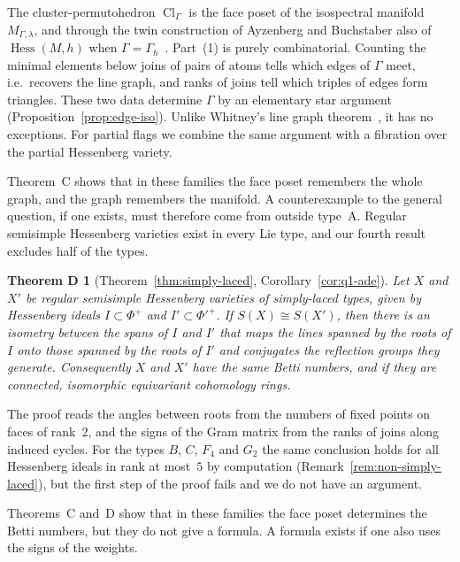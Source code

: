 \documentclass[11pt,a4paper]{article}
\numberwithin{equation}{section}
\theoremstyle{plain}
\newtheorem*{theoremD}{Theorem D}
\theoremstyle{definition}
\theoremstyle{remark}
\DeclareMathOperator{\Hess}{Hess}
\DeclareMathOperator{\Cl}{Cl}
\begin{document}
The cluster-permutohedron $\Cl_\Gamma$ is the face poset of the isospectral manifold $M_{\Gamma,\lambda}$, and through the twin construction of Ayzenberg and Buchstaber also of $\Hess(M,h)$ when $\Gamma=\Gamma_h$~\cite{AB21,AB24}. Part~(1) is purely combinatorial. Counting the minimal elements below joins of pairs of atoms tells which edges of $\Gamma$ meet, i.e.\ recovers the line graph, and ranks of joins tell which triples of edges form triangles. These two data determine $\Gamma$ by an elementary star argument (Proposition~\ref{prop:edge-iso}). Unlike Whitney's line graph theorem~\cite{Whi32,Jun66}, it has no exceptions. For partial flags we combine the same argument with a fibration over the partial Hessenberg variety.

Theorem~C shows that in these families the face poset remembers the whole graph, and the graph remembers the manifold. A counterexample to the general question, if one exists, must therefore come from outside type~A. Regular semisimple Hessenberg varieties exist in every Lie type, and our fourth result excludes half of the types.

\begin{theoremD}[Theorem~\ref{thm:simply-laced}, Corollary~\ref{cor:q1-ade}]
Let $X$ and $X'$ be regular semisimple Hessenberg varieties of simply-laced types, given by Hessenberg ideals $I\subset\Phi^+$ and $I'\subset\Phi'^+$. If $S(X)\cong S(X')$, then there is an isometry between the spans of $I$ and $I'$ that maps the lines spanned by the roots of $I$ onto those spanned by the roots of $I'$ and conjugates the reflection groups they generate. Consequently $X$ and $X'$ have the same Betti numbers, and if they are connected, isomorphic equivariant cohomology rings.
\end{theoremD}

The proof reads the angles between roots from the numbers of fixed points on faces of rank~$2$, and the signs of the Gram matrix from the ranks of joins along induced cycles. For the types $B$, $C$, $F_4$ and $G_2$ the same conclusion holds for all Hessenberg ideals in rank at most~$5$ by computation (Remark~\ref{rem:non-simply-laced}), but the first step of the proof fails and we do not have an argument.

Theorems~C and~D show that in these families the face poset determines the Betti numbers, but they do not give a formula. A formula exists if one also uses the signs of the weights.
\end{document}
